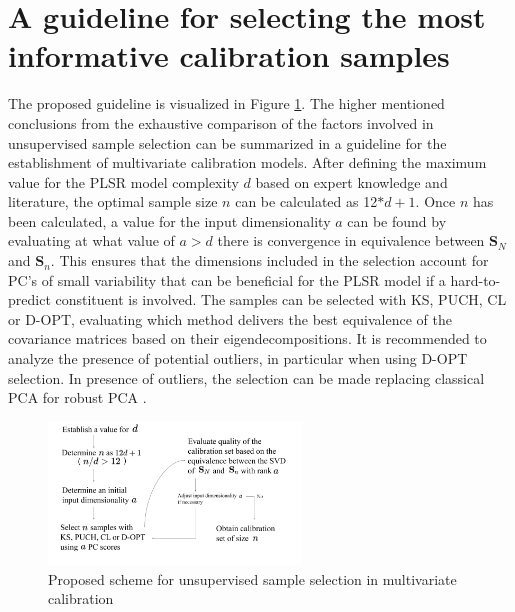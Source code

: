 \documentclass[journal=ancham,manuscript=article]{achemso}
\begin{document}

\section*{A guideline for selecting the most informative calibration samples}\label{scheme}

The proposed guideline is visualized in Figure \ref{fig_scheme}. The higher mentioned conclusions from the exhaustive comparison of the factors involved in unsupervised sample selection can be summarized in a guideline for the establishment of multivariate calibration models. After defining the maximum value for the PLSR model complexity $d$ based on expert knowledge and literature, the optimal sample size $n$ can be calculated as 12$*d+1$. Once $n$ has been calculated, a value for the input dimensionality $a$ can be found by evaluating at what value of $a>d$ there is convergence in equivalence between $\mathbf{S}_N$ and $\mathbf{S}_n$. This ensures that the dimensions included in the selection account for PC's of small variability that can be beneficial for the PLSR model if a hard-to-predict constituent is involved. The samples can be selected with KS, PUCH, CL or D-OPT, evaluating which method delivers the best equivalence of the covariance matrices based on their eigendecompositions. It is recommended to analyze the presence of potential outliers, in particular when using D-OPT selection. In presence of outliers, the selection can be made replacing classical PCA for robust PCA \cite{Hubert2005}.


\begin{figure}[b]
\includegraphics[width=0.6\textwidth]{manuscript/figures/scheme.png}
\centering
\caption{Proposed scheme for unsupervised sample selection in multivariate calibration}
\label{fig_scheme}
\end{figure}

\end{document}
